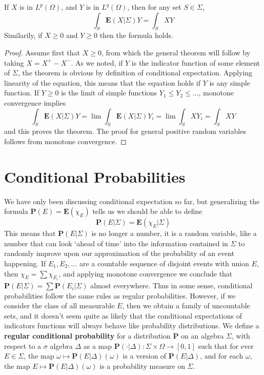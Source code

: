 \begin{lemma}
    If $X$ is in $L^p(\Omega)$, and $Y$ is in $L^q(\Omega)$, then for any set $S \in \Sigma$,
    \[ \int_S \mathbf{E}(X|\Sigma) Y = \int_S XY \]
    Similarily, if $X \geq 0$ and $Y \geq 0$ then the formula holds.
\end{lemma}
\begin{proof}
    Assume first that $X \geq 0$, from which the general theorem will follow by taking $X = X^+ - X^-$. As we noted, if $Y$ is the indicator function of some element of $\Sigma$, the theorem is obvious by definition of conditional expectation. Applying linearity of the equation, this means that the equation holds if $Y$ is any simple function. If $Y \geq 0$ is the limit of simple functions $Y_1 \leq Y_2 \leq \dots$, monotone convergence implies
    \[ \int_S \mathbf{E}(X|\Sigma) Y = \lim \int_S \mathbf{E}(X|\Sigma) Y_i = \lim \int_S XY_i = \int_S XY \]
    and this proves the theorem. The proof for general positive random variables follows from monotone convergence.
\end{proof}

\section{Conditional Probabilities}

We have only been discussing conditional expectation so far, but generalizing the formula $\mathbf{P}(E) = \mathbf{E}(\chi_E)$ tells us we should be able to define
%
\[ \mathbf{P}(E|\Sigma) = \mathbf{E}(\chi_E | \Sigma) \]
%
This means that $\mathbf{P}(E|\Sigma)$ is no longer a number, it is a random variable, like a number that can look `ahead of time' into the information contained in $\Sigma$ to randomly improve upon our approximation of the probability of an event happening. If $E_1, E_2, \dots$ are a countable sequence of disjoint events with union $E$, then $\chi_E = \sum \chi_{E_i}$, and applying monotone convergence we conclude that $\mathbf{P}(E|\Sigma) = \sum \mathbf{P}(E_i|\Sigma)$ almost everywhere. Thus in some sense, conditional probabilities follow the same rules as regular probabilities. However, if we consider the class of all measurable $E$, then we obtain a family of uncountable sets, and it doesn't seem quite as likely that the conditional expectations of indicators functions will always behave like probability distributions. We define a {\bf regular conditional probability} for a distribution $\mathbf{P}$ on an algebra $\Sigma$, with respect to a $\sigma$ algebra $\Delta$ as a map $\mathbf{P}(\cdot |\Delta): \Sigma \times \Omega \to [0,1]$ such that for ever $E \in \Sigma$, the map $\omega \mapsto \mathbf{P}(E|\Delta)(\omega)$ is a version of $\mathbf{P}(E|\Delta)$, and for each $\omega$, the map $E \mapsto \mathbf{P}(E|\Delta)(\omega)$ is a probability measure on $\Sigma$.

